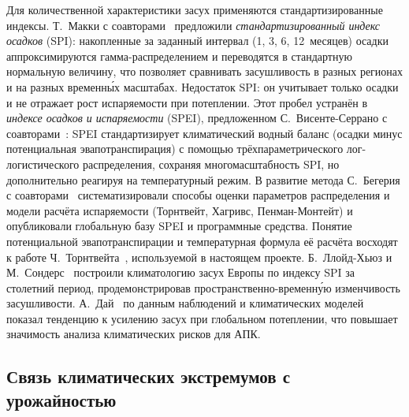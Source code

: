 \documentclass[14pt,a4paper]{extarticle}
\begin{document}
Для количественной характеристики засух применяются стандартизированные индексы. Т.~Макки с соавторами~\cite{mckee1993} предложили \emph{стандартизированный индекс осадков} (SPI): накопленные за заданный интервал (1, 3, 6, 12~месяцев) осадки аппроксимируются гамма-распределением и переводятся в стандартную нормальную величину, что позволяет сравнивать засушливость в разных регионах и на разных временны́х масштабах. Недостаток SPI: он учитывает только осадки и не отражает рост испаряемости при потеплении. Этот пробел устранён в \emph{индексе осадков и испаряемости} (SPEI), предложенном С.~Висенте-Серрано с соавторами~\cite{vicenteserrano2010}: SPEI стандартизирует климатический водный баланс (осадки минус потенциальная эвапотранспирация) с помощью трёхпараметрического лог-логистического распределения, сохраняя многомасштабность SPI, но дополнительно реагируя на температурный режим. В развитие метода С.~Бегерия с соавторами~\cite{begueria2014} систематизировали способы оценки параметров распределения и модели расчёта испаряемости (Торнтвейт, Хагривс, Пенман-Монтейт) и опубликовали глобальную базу SPEI и программные средства. Понятие потенциальной эвапотранспирации и температурная формула её расчёта восходят к работе Ч.~Торнтвейта~\cite{thornthwaite1948}, используемой в настоящем проекте. Б.~Ллойд-Хьюз и М.~Сондерс~\cite{lloydhughes2002} построили климатологию засух Европы по индексу SPI за столетний период, продемонстрировав пространственно-временну́ю изменчивость засушливости. А.~Дай~\cite{dai2013} по данным наблюдений и климатических моделей показал тенденцию к усилению засух при глобальном потеплении, что повышает значимость анализа климатических рисков для АПК.

\subsection{Связь климатических экстремумов с урожайностью}
\end{document}
